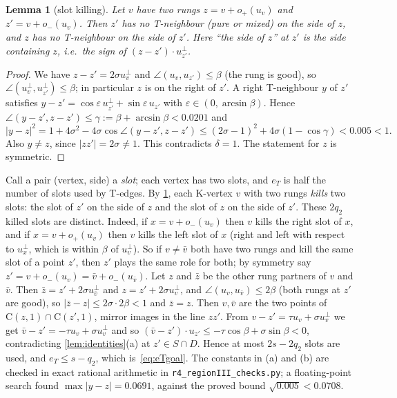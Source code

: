 \documentclass[11pt]{amsart}
\newtheorem{lemma}[theorem]{Lemma}
\theoremstyle{definition}
\theoremstyle{remark}
\newcommand{\eps}{\varepsilon}
\newcommand{\Cc}{\mathrm{C}}      %
\begin{document}
\begin{lemma}[slot killing]\label{lem:slot}
Let $v$ have two rungs $z=v+o_+(u_v)$ and $z'=v+o_-(u_v)$. Then $z'$ has no T-neighbour (pure or mixed) on the side of $z$, and $z$ has no T-neighbour on the side of $z'$. Here ``the side of $z$'' at $z'$ is the side containing $z$, i.e.\ the sign of $(z-z')\cdot u_{z'}^\perp$.
\end{lemma}
\begin{proof}
We have $z-z'=2\sigma u_v^\perp$ and $\angle(u_v,u_{z'})\le\beta$ (the rung is good), so $\angle(u_v^\perp,u_{z'}^\perp)\le\beta$; in particular $z$ is on the right of $z'$. A right T-neighbour $y$ of $z'$ satisfies $y-z'=\cos\eps\,u_{z'}^\perp+\sin\eps\,u_{z'}$ with $\eps\in(0,\arcsin\beta)$. Hence $\angle(y-z',z-z')\le\gamma:=\beta+\arcsin\beta<0.0201$ and
\[
|y-z|^2=1+4\sigma^2-4\sigma\cos\angle(y-z',z-z')\le(2\sigma-1)^2+4\sigma(1-\cos\gamma)<0.005<1.
\]
Also $y\ne z$, since $|zz'|=2\sigma\ne1$. This contradicts $\delta=1$. The statement for $z$ is symmetric.
\end{proof}

Call a pair (vertex, side) a \emph{slot}; each vertex has two slots, and $e_T$ is half the number of slots used by T-edges. By \cref{lem:slot}, each K-vertex $v$ with two rungs \emph{kills} two slots: the slot of $z'$ on the side of $z$ and the slot of $z$ on the side of $z'$. These $2q_2$ killed slots are distinct. Indeed, if $x=v+o_-(u_v)$ then $v$ kills the right slot of $x$, and if $x=v+o_+(u_v)$ then $v$ kills the left slot of $x$ (right and left with respect to $u_x^\perp$, which is within $\beta$ of $u_v^\perp$). So if $v\ne\bar v$ both have two rungs and kill the same slot of a point $z'$, then $z'$ plays the same role for both; by symmetry say $z'=v+o_-(u_v)=\bar v+o_-(u_{\bar v})$. Let $z$ and $\bar z$ be the other rung partners of $v$ and $\bar v$. Then $\bar z=z'+2\sigma u_{\bar v}^\perp$ and $z=z'+2\sigma u_v^\perp$, and $\angle(u_v,u_{\bar v})\le2\beta$ (both rungs at $z'$ are good), so $|\bar z-z|\le2\sigma\cdot2\beta<1$ and $\bar z=z$. Then $v,\bar v$ are the two points of $\Cc(z,1)\cap\Cc(z',1)$, mirror images in the line $zz'$. From $v-z'=\tau u_v+\sigma u_v^\perp$ we get $\bar v-z'=-\tau u_v+\sigma u_v^\perp$ and so $(\bar v-z')\cdot u_{z'}\le-\tau\cos\beta+\sigma\sin\beta<0$, contradicting \cref{lem:identities}(a) at $z'\in S\cap D$. Hence at most $2s-2q_2$ slots are used, and $e_T\le s-q_2$, which is~\eqref{eq:eTgoal}. The constants in (a) and (b) are checked in exact rational arithmetic in \texttt{r4\_regionIII\_checks.py}; a floating-point search found $\max|y-z|=0.0691$, against the proved bound $\sqrt{0.005}<0.0708$.
\end{document}
